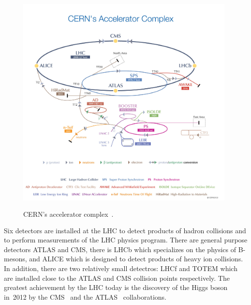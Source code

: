 \begin{figure}[htb]
  \begin{center}
    {\includegraphics[width=0.98\textwidth]{../figs/Exp/CERN_accelerator_complex2013.jpg}}
    \caption{CERN's accelerator complex~\cite{ref_fig_CERNacceleratorComplex}.}
    \label{fig:CERN_accelerator_complex}
  \end{center}
\end{figure}




Six detectors are installed at the LHC to detect products of hadron collisions and to perform measurements of the LHC physics program. There are general purpose detectors ATLAS and CMS, there is LHCb which specializes on the physics of B-mesons, and ALICE which is designed to detect products of heavy ion collisions. In addition, there are two relatively small detectros: LHCf and TOTEM which are installed close to the ATLAS and CMS collision points respectively. The greatest achievement by the LHC today is the discovery of the Higgs boson in~2012 by the CMS~\cite{ref_HiggsPaperCMS} and the ATLAS~\cite{ref_HiggsPaperATLAS} collaborations. 

